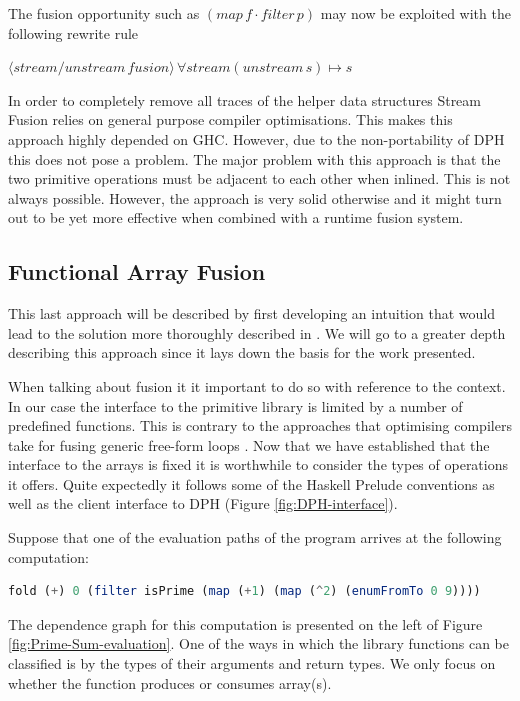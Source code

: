 \documentclass[preamble.tex]{subfiles}
\begin{document}
The fusion opportunity such as $(map\, f\cdot filter\, p)$ may now be exploited with the following rewrite rule

$\langle stream/unstream\, fusion\rangle\,\forall stream(unstream\, s)\mapsto s$

In order to completely remove all traces of the helper data structures Stream Fusion relies on general purpose compiler optimisations. This makes this approach highly depended on GHC. However, due to the non-portability of DPH this does not pose a problem. The major problem with this approach is that the two primitive operations must be adjacent to each other when inlined. This is not always possible. However, the approach is very solid otherwise and it might turn out to be yet more effective when combined with a runtime fusion system.


\subsection{Functional Array Fusion}

This last approach will be described by first developing an intuition that would lead to the solution more thoroughly described in \cite{CK01,CK03}. We will go to a greater depth describing this approach since it lays down the basis for the work presented.

When talking about fusion it it important to do so with reference to the context. In our case the interface to the primitive library is limited by a number of predefined functions. This is contrary to the approaches that optimising compilers take for fusing generic free-form loops \cite{KA02}. Now that we have established that the interface to the arrays is fixed it is worthwhile to consider the types of operations it offers. Quite expectedly it follows some of the Haskell Prelude conventions as well as the client interface to DPH (Figure \vref{fig:DPH-interface}).

Suppose that one of the evaluation paths of the program arrives at the following computation:

\begin{lstlisting}[basicstyle={\ttfamily},language=Haskell]
fold (+) 0 (filter isPrime (map (+1) (map (^2) (enumFromTo 0 9))))
\end{lstlisting}


The dependence graph \cite{RMKB06,KA02} for this computation is presented on the left of Figure \vref{fig:Prime-Sum-evaluation}. One of the ways in which the library functions can be classified is by the types of their arguments and return types. We only focus on whether the function produces or consumes array(s).
\end{document}

